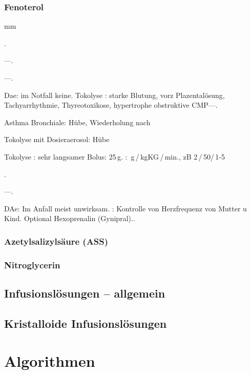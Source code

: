 \subsubsection{Fenoterol}

\begin{labeling}[:]{mm}
  \item[Präp] .
  \item[Beschreibung] ---.
  \item[Ind] ---.
  \item[KI]  Dae: im Notfall keine. Tokolyse : starke Blutung, vorz
  Plazentalösung, Tachyarrhythmie, Thyreotoxikose, hypertrophe obstruktive
  CMP---.
  \item[Rx]
  \begin{inparaitem}
  \item Asthma Bronchiale:  Hübe, Wiederholung nach
  \item Tokolyse mit Dosieraerosol:  Hübe
  \item Tokolyse : sehr langsamer Bolus: 25\,{\textmu}g.
  : \,{\textmu}g\,/\,kgKG\,/\,min., zB
  2\Mg\,/\,50\Ml*/\,1-5 
  \end{inparaitem}.
  \item[Cave] ---.
  \item[Anm] DAe: Im Anfall meist unwirksam. : Kontrolle von Herzfrequenz von Mutter u
  Kind. Optional Hexoprenalin (Gynipral)..
\end{labeling}


\subsubsection{Azetylsalizylsäure (ASS)}

\subsubsection{Nitroglycerin}



\subsection{Infusionslösungen -- allgemein}

\subsection{Kristalloide Infusionslösungen}




\section{Algorithmen}
\ChapterEnd